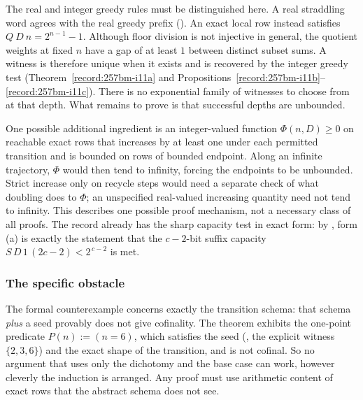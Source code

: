 The real and integer greedy rules must be distinguished here.
A real straddling word agrees with the real greedy prefix
().
An exact local row instead satisfies
$\ensuremath{Q}\ D\ n=2^{n-1}-1$.  Although floor division is not
injective in general, the quotient weights at fixed $n$ have a gap of
at least $1$ between distinct subset sums.  A witness is therefore
unique when it exists and is recovered by the integer greedy test
(Theorem~\ref{record:257bm-i11a} and
Propositions~\ref{record:257bm-i11b}--\ref{record:257bm-i11c}).
There is no exponential family of witnesses to choose from at that
depth.  What remains to prove is that successful depths are unbounded.

One possible additional ingredient is an integer-valued function
$\Phi(n,D)\ge0$ on reachable exact rows that increases by at least one
under each permitted transition and is bounded on rows of bounded
endpoint.  Along an infinite trajectory, $\Phi$ would then tend to
infinity, forcing the endpoints to be unbounded.  Strict increase only
on recycle steps would need a separate check of what doubling does to
$\Phi$; an unspecified real-valued increasing quantity need not tend
to infinity.
This describes one possible proof mechanism, not a necessary class of
all proofs. The record already has the sharp
capacity test in exact form: by
,
form (a) is exactly the statement that the $c-2$-bit suffix capacity
$\ensuremath{S}\,D\,1\,(2c-2)<2^{\,c-2}$ is met.

\subsubsection*{The specific obstacle}

The formal counterexample concerns exactly the transition schema:
that schema \emph{plus} a seed provably does not give cofinality. The theorem
exhibits the one-point predicate $P(n):=(n=6)$, which satisfies the seed
(, the explicit witness
$\{2,3,6\}$) and the exact shape of the transition, and is not cofinal. So no argument that uses
only the dichotomy and the base case can work, however cleverly the induction is arranged. Any
proof must use arithmetic content of exact rows that the abstract
schema does not see.

